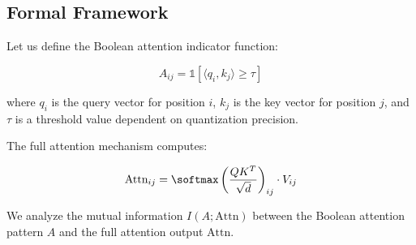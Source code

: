 \subsection{Formal Framework}













Let us define the Boolean attention indicator function:






$$






A_{ij} = \mathbb{1}[\langle q_i, k_j \rangle \geq \tau]






$$






where $q_i$ is the query vector for position $i$, $k_j$ is the key vector for position $j$, and $\tau$ is a threshold value dependent on quantization precision.













The full attention mechanism computes:






$$






\text{Attn}_{ij} = \softmax\left(\frac{QK^T}{\sqrt{d}}\right)_{ij} \cdot V_{ij}






$$













We analyze the mutual information $I(A; \text{Attn})$ between the Boolean attention pattern $A$ and the full attention output $\text{Attn}$. 













